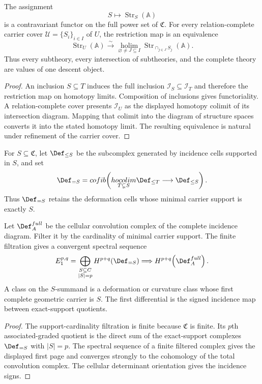 \begin{theorem}
The assignment
\[
 S\longmapsto\operatorname{Str}_S(\mathbb A)
\]
is a contravariant functor on the full power set of $\mathfrak C$.  For every relation-complete carrier cover $\mathcal U=\{S_i\}_{i\in I}$ of $U$, the restriction map is an equivalence
\[
 \operatorname{Str}_U(\mathbb A)
 \xrightarrow{\sim}
 \underset{\varnothing\ne J\subseteq I}{\operatorname{holim}}
 \operatorname{Str}_{\cap_{j\in J}S_j}(\mathbb A).
\]
Thus every subtheory, every intersection of subtheories, and the complete theory are values of one descent object.
\end{theorem}
\begin{proof}
An inclusion $S\subseteq T$ induces the full inclusion $\mathcal I_S\subseteq\mathcal I_T$ and therefore the restriction map on homotopy limits.  Composition of inclusions gives functoriality.  A relation-complete cover presents $\mathcal I_U$ as the displayed homotopy colimit of its intersection diagram.  Mapping that colimit into the diagram of structure spaces converts it into the stated homotopy limit.  The resulting equivalence is natural under refinement of the carrier cover.
\end{proof}

\begin{definition}
For $S\subseteq\mathfrak C$, let $\Def_{\leq S}$ be the subcomplex generated by incidence cells supported in $S$, and set
\[
 \Def_{=S}
 =\operatorname{cofib}\!\left(
   \underset{T\subsetneq S}{\operatorname{hocolim}}
   \Def_{\leq T}
   \longrightarrow
   \Def_{\leq S}
 \right).
\]
Thus $\Def_{=S}$ retains the deformation cells whose minimal carrier support is exactly $S$.
\end{definition}

\begin{theorem}
Let $\Def_{\mathbb A}^{\mathrm{full}}$ be the cellular convolution complex of the complete incidence diagram.  Filter it by the cardinality of minimal carrier support.  The finite filtration gives a convergent spectral sequence
\[
 E_1^{p,q}
 =\bigoplus_{\substack{S\subseteq\mathfrak C\\|S|=p}}
 H^{p+q}(\Def_{=S})
 \Longrightarrow
 H^{p+q}\!\left(\Def_{\mathbb A}^{\mathrm{full}}\right).
\]
A class on the $S$-summand is a deformation or curvature class whose first complete geometric carrier is $S$.  The first differential is the signed incidence map between exact-support quotients.
\end{theorem}
\begin{proof}
The support-cardinality filtration is finite because $\mathfrak C$ is finite.  Its $p$th associated-graded quotient is the direct sum of the exact-support complexes $\Def_{=S}$ with $|S|=p$.  The spectral sequence of a finite filtered complex gives the displayed first page and converges strongly to the cohomology of the total convolution complex.  The cellular determinant orientation gives the incidence signs.
\end{proof}

